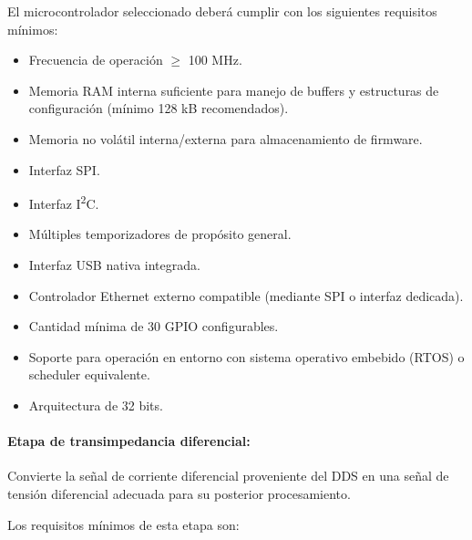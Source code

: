 El microcontrolador seleccionado deberá cumplir con los siguientes requisitos mínimos:

\begin{itemize}[label=\textbullet]
	\item Frecuencia de operación $\geq$ 100 MHz.
	\item Memoria RAM interna suficiente para manejo de buffers y estructuras de configuración (mínimo 128 kB recomendados).
	\item Memoria no volátil interna/externa para almacenamiento de firmware.
	\item Interfaz SPI.
	\item Interfaz I\textsuperscript{2}C.
	\item Múltiples temporizadores de propósito general.
	\item Interfaz USB nativa integrada.
	\item Controlador Ethernet externo compatible (mediante SPI o interfaz dedicada).
	\item Cantidad mínima de 30 GPIO configurables.
	\item Soporte para operación en entorno con sistema operativo embebido (RTOS) o scheduler equivalente.
	\item Arquitectura de 32 bits.
\end{itemize}

\paragraph{Etapa de transimpedancia diferencial:} Convierte la señal de corriente diferencial proveniente del DDS en una señal de tensión diferencial adecuada para su posterior procesamiento.

Los requisitos mínimos de esta etapa son:

